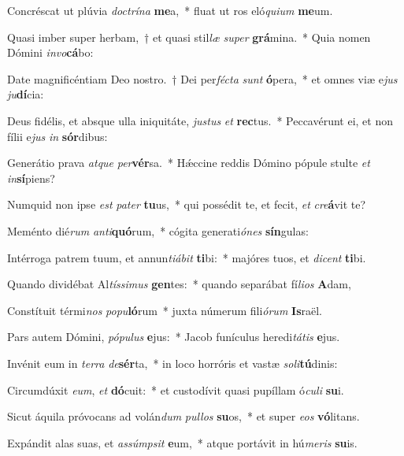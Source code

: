 \item Concréscat ut plúvia \textit{doc}\textit{trí}\textit{na} \textbf{me}a,~* fluat ut ros eló\textit{qui}\textit{um} \textbf{me}um.
\item Quasi imber super herbam,~† et quasi stil\textit{læ} \textit{su}\textit{per} \textbf{grá}mina.~* Quia nomen Dómini \textit{in}\textit{vo}\textbf{cá}bo:
\item Date magnificéntiam Deo nostro.~† Dei per\textit{féc}\textit{ta} \textit{sunt} \textbf{ó}pera,~* et omnes viæ e\textit{jus} \textit{ju}\textbf{dí}cia:
\item Deus fidélis, et absque ulla iniquitáte, \textit{jus}\textit{tus} \textit{et} \textbf{rec}tus.~* Peccavérunt ei, et non fílii e\textit{jus} \textit{in} \textbf{sór}dibus:
\item Generátio prava \textit{at}\textit{que} \textit{per}\textbf{vér}sa.~* Hǽccine reddis Dómino pópule stulte \textit{et} \textit{in}\textbf{sí}piens?
\item Numquid non ipse \textit{est} \textit{pa}\textit{ter} \textbf{tu}us,~* qui possédit te, et fecit, \textit{et} \textit{cre}\textbf{á}vit te?
\item Meménto dié\textit{rum} \textit{an}\textit{ti}\textbf{quó}rum,~* cógita generati\textit{ó}\textit{nes} \textbf{sín}gulas:
\item Intérroga patrem tuum, et annun\textit{ti}\textit{á}\textit{bit} \textbf{ti}bi:~* majóres tuos, et \textit{di}\textit{cent} \textbf{ti}bi.
\item Quando dividébat Al\textit{tís}\textit{si}\textit{mus} \textbf{gen}tes:~* quando separábat fí\textit{li}\textit{os} \textbf{A}dam,
\item Constítuit térmi\textit{nos} \textit{po}\textit{pu}\textbf{ló}rum~* juxta númerum fili\textit{ó}\textit{rum} \textbf{Is}raël.
\item Pars autem Dómini, \textit{pó}\textit{pu}\textit{lus} \textbf{e}jus:~* Jacob funículus heredi\textit{tá}\textit{tis} \textbf{e}jus.
\item Invénit eum in \textit{ter}\textit{ra} \textit{de}\textbf{sér}ta,~* in loco horróris et vastæ \textit{so}\textit{li}\textbf{tú}dinis:
\item Circumdúxit \textit{e}\textit{um}, \textit{et} \textbf{dó}cuit:~* et custodívit quasi pupíllam ó\textit{cu}\textit{li} \textbf{su}i.
\item Sicut áquila próvocans ad volán\textit{dum} \textit{pul}\textit{los} \textbf{su}os,~* et super \textit{e}\textit{os} \textbf{vó}litans.
\item Expándit alas suas, et \textit{as}\textit{súmp}\textit{sit} \textbf{e}um,~* atque portávit in hú\textit{me}\textit{ris} \textbf{su}is.
